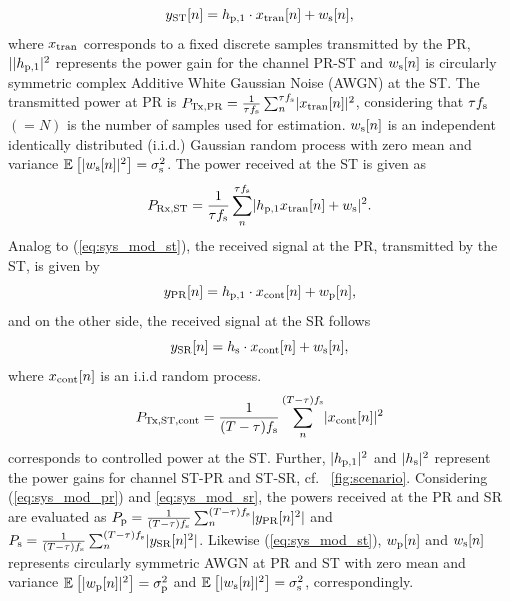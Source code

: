 \begin{equation}
y_{\text{ST}}[n] = h_{\text{p,1}} \cdot x_{\text{tran}}[n] + w_{\text{s}}[n],
\label{eq:sys_mod_st}
\end{equation}
where $x_{\text{tran}}$ corresponds to a fixed discrete samples transmitted by the PR, $||h_{\text{p,1}}|^2$ represents the power gain for the channel PR-ST and $w_{\text{s}}[n]$ is circularly symmetric complex Additive White Gaussian Noise (AWGN) at the ST.
The transmitted power at PR is $P_{\text{Tx,PR}} = {\frac{1}{{\tau f_{\text{s}}}}\sum_n^{\tau f_{\text{s}}}} {|x_{\text{tran}}[n]|^2}$, considering that $\tau f_{\text{s}}$ $(= N)$ is the number of samples used for estimation. $w_{\text{s}}[n]$ is an independent identically distributed (i.i.d.) Gaussian random process with zero mean and variance ${\mathbb E}_{}\left[ |w_{\text{s}}[n]|^2 \right] = \sigma^2_{\text{s}}$. The power received at the ST is given as
\begin{align}
P_{\text{Rx,ST}} = {\frac{1}{{\tau f_{\text{s}}}}\sum_n^{\tau f_{\text{s}}}} { |h_{\text{p,1}} x_{\text{tran}}[n] + w_{\text{s}}|^2}.
\label{eq:prcvd} 
\end{align}
Analog to (\ref{eq:sys_mod_st}), the received signal at the PR, transmitted by the ST, is given by
\begin{equation}
y_{\text{PR}}[n] = h_{\text{p,1}} \cdot x_{\text{cont}}[n] + w_{\text{p}}[n],
\label{eq:sys_mod_pr}
\end{equation}
and on the other side, the received signal at the SR follows
\begin{equation}
y_{\text{SR}}[n] = h_{\text{s}} \cdot x_{\text{cont}}[n] + w_{\text{s}}[n],
\label{eq:sys_mod_sr}
\end{equation}
where $x_{\text{cont}}[n]$ is an i.i.d random process. 
\begin{align}
P_{\text{Tx,ST,cont}} = {\frac{1}{{(T - \tau) f_{\text{s}}}}\sum_n^{(T - \tau) f_{\text{s}}}} {|x_{\text{cont}}[n]|^2} 
\label{eq:preg} 
\end{align}
corresponds to controlled power at the ST. Further, $|h_{\text{p,1}}|^2$ and $|h_{\text{s}}|^2$ represent the power gains for channel ST-PR and ST-SR, cf. \figurename~\ref{fig:scenario}.
Considering (\ref{eq:sys_mod_pr}) and \ref{eq:sys_mod_sr}, the powers received at the PR and SR are evaluated as $P_{\text{p}} = {\frac{1}{{(T - \tau) f_{\text{s}}}}\sum_n^{(T - \tau) f_{\text{s}}}} {|y_{\text{PR}}[n]^2|}$ and $P_{\text{s}} = {\frac{1}{{(T - \tau) f_{\text{s}}}}\sum_n^{(T - \tau) f_{\text{s}}}} {|y_{\text{SR}}[n]^2|}$. Likewise (\ref{eq:sys_mod_st}), $w_{\text{p}}[n]$ and $w_{\text{s}}[n]$ represents circularly symmetric AWGN at PR and ST with zero mean and variance ${\mathbb E}_{}\left[ |w_{\text{p}}[n]|^2 \right] = \sigma^2_{\text{p}}$ and ${\mathbb E}_{}\left[ |w_{\text{s}}[n]|^2 \right] = \sigma^2_{\text{s}}$, correspondingly. %

